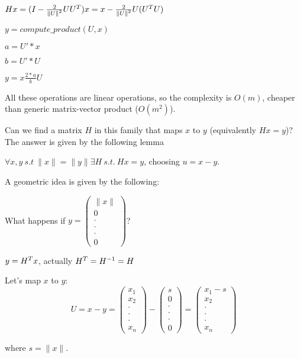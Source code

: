 \documentclass[ComputationalMathematics.tex]{subfiles}
\begin{document}
\begin{example}
$Hx = (I - \frac{2}{{\|U\|}^{2}} U {U}^{T})x = x - \frac{2}{{\|U\|}^{2}} U ({U}^{T} U)$

$y = compute\_product(U,x)$

$a = U' * x$

$b= U' * U$

$y = x \frac{2*a}{b} U$

All these operations are linear operations, so the complexity is $O(m)$, cheaper than generic matrix-vector product ($O(m^2)$).
\end{example}

Can we find a matrix $H$ in this family that maps $x$ to $y$ (equivalently $Hx = y$)? The answer is given by the following lemma

\begin{lemma}
 $\forall x, y ~ s.t ~ \|x\| = \|y\| \exists H ~ s.t. ~ Hx = y$, choosing $u = x - y$.
\end{lemma}

A geometric idea is given by the following:


What happens if $y = \begin{pmatrix} \|x\|\\ 0\\ \cdot\\ \cdot\\ \cdot\\ 0\end{pmatrix}$?
  
  $y = {H}^{T}x$, actually ${H}^{T} = {H}^{-1} = H$
  
  Let's map $x$ to $y$: 
  \[
    U = x - y =
  \begin{pmatrix} {}x_{1}\\ {x}_{2}\\ \cdot\\ \cdot\\ \cdot\\{x}_{n}\end{pmatrix} - \begin{pmatrix} s\\ 0\\ \cdot\\ \cdot\\ \cdot\\ 0 \end{pmatrix} = 
    \begin{pmatrix} {x}_{1}-s\\ {x}_{2}\\ \cdot\\ \cdot\\ \cdot\\ {x}_{n} \end{pmatrix}
  \]
      
      where $s = \|x\|$.

\end{document}
